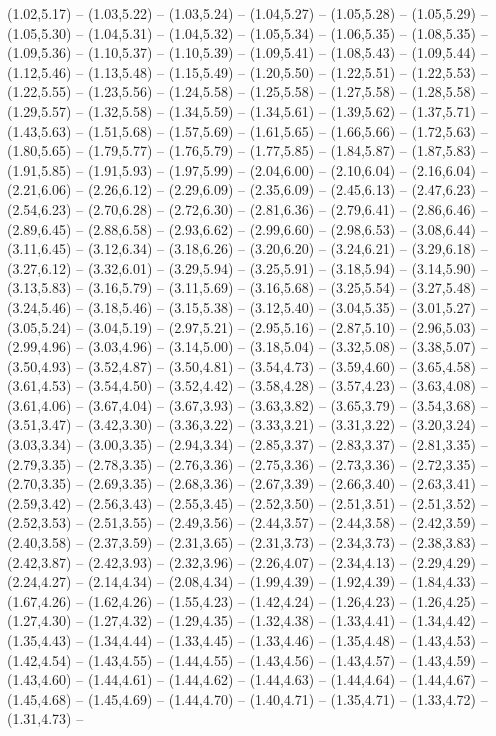 \expandafter\def\csname geo:gebiet:DE-RP\endcsname{
  (1.02,5.17) -- (1.03,5.22) -- (1.03,5.24) -- (1.04,5.27) -- (1.05,5.28) -- (1.05,5.29) -- (1.05,5.30) -- (1.04,5.31) -- (1.04,5.32) -- (1.05,5.34) -- (1.06,5.35) -- (1.08,5.35) -- (1.09,5.36) -- (1.10,5.37) -- (1.10,5.39) -- (1.09,5.41) -- (1.08,5.43) -- (1.09,5.44) -- (1.12,5.46) -- (1.13,5.48) -- (1.15,5.49) -- (1.20,5.50) -- (1.22,5.51) -- (1.22,5.53) -- (1.22,5.55) -- (1.23,5.56) -- (1.24,5.58) -- (1.25,5.58) -- (1.27,5.58) -- (1.28,5.58) -- (1.29,5.57) -- (1.32,5.58) -- (1.34,5.59) -- (1.34,5.61) -- (1.39,5.62) -- (1.37,5.71) -- (1.43,5.63) -- (1.51,5.68) -- (1.57,5.69) -- (1.61,5.65) -- (1.66,5.66) -- (1.72,5.63) -- (1.80,5.65) -- (1.79,5.77) -- (1.76,5.79) -- (1.77,5.85) -- (1.84,5.87) -- (1.87,5.83) -- (1.91,5.85) -- (1.91,5.93) -- (1.97,5.99) -- (2.04,6.00) -- (2.10,6.04) -- (2.16,6.04) -- (2.21,6.06) -- (2.26,6.12) -- (2.29,6.09) -- (2.35,6.09) -- (2.45,6.13) -- (2.47,6.23) -- (2.54,6.23) -- (2.70,6.28) -- (2.72,6.30) -- (2.81,6.36) -- (2.79,6.41) -- (2.86,6.46) -- (2.89,6.45) -- (2.88,6.58) -- (2.93,6.62) -- (2.99,6.60) -- (2.98,6.53) -- (3.08,6.44) -- (3.11,6.45) -- (3.12,6.34) -- (3.18,6.26) -- (3.20,6.20) -- (3.24,6.21) -- (3.29,6.18) -- (3.27,6.12) -- (3.32,6.01) -- (3.29,5.94) -- (3.25,5.91) -- (3.18,5.94) -- (3.14,5.90) -- (3.13,5.83) -- (3.16,5.79) -- (3.11,5.69) -- (3.16,5.68) -- (3.25,5.54) -- (3.27,5.48) -- (3.24,5.46) -- (3.18,5.46) -- (3.15,5.38) -- (3.12,5.40) -- (3.04,5.35) -- (3.01,5.27) -- (3.05,5.24) -- (3.04,5.19) -- (2.97,5.21) -- (2.95,5.16) -- (2.87,5.10) -- (2.96,5.03) -- (2.99,4.96) -- (3.03,4.96) -- (3.14,5.00) -- (3.18,5.04) -- (3.32,5.08) -- (3.38,5.07) -- (3.50,4.93) -- (3.52,4.87) -- (3.50,4.81) -- (3.54,4.73) -- (3.59,4.60) -- (3.65,4.58) -- (3.61,4.53) -- (3.54,4.50) -- (3.52,4.42) -- (3.58,4.28) -- (3.57,4.23) -- (3.63,4.08) -- (3.61,4.06) -- (3.67,4.04) -- (3.67,3.93) -- (3.63,3.82) -- (3.65,3.79) -- (3.54,3.68) -- (3.51,3.47) -- (3.42,3.30) -- (3.36,3.22) -- (3.33,3.21) -- (3.31,3.22) -- (3.20,3.24) -- (3.03,3.34) -- (3.00,3.35) -- (2.94,3.34) -- (2.85,3.37) -- (2.83,3.37) -- (2.81,3.35) -- (2.79,3.35) -- (2.78,3.35) -- (2.76,3.36) -- (2.75,3.36) -- (2.73,3.36) -- (2.72,3.35) -- (2.70,3.35) -- (2.69,3.35) -- (2.68,3.36) -- (2.67,3.39) -- (2.66,3.40) -- (2.63,3.41) -- (2.59,3.42) -- (2.56,3.43) -- (2.55,3.45) -- (2.52,3.50) -- (2.51,3.51) -- (2.51,3.52) -- (2.52,3.53) -- (2.51,3.55) -- (2.49,3.56) -- (2.44,3.57) -- (2.44,3.58) -- (2.42,3.59) -- (2.40,3.58) -- (2.37,3.59) -- (2.31,3.65) -- (2.31,3.73) -- (2.34,3.73) -- (2.38,3.83) -- (2.42,3.87) -- (2.42,3.93) -- (2.32,3.96) -- (2.26,4.07) -- (2.34,4.13) -- (2.29,4.29) -- (2.24,4.27) -- (2.14,4.34) -- (2.08,4.34) -- (1.99,4.39) -- (1.92,4.39) -- (1.84,4.33) -- (1.67,4.26) -- (1.62,4.26) -- (1.55,4.23) -- (1.42,4.24) -- (1.26,4.23) -- (1.26,4.25) -- (1.27,4.30) -- (1.27,4.32) -- (1.29,4.35) -- (1.32,4.38) -- (1.33,4.41) -- (1.34,4.42) -- (1.35,4.43) -- (1.34,4.44) -- (1.33,4.45) -- (1.33,4.46) -- (1.35,4.48) -- (1.43,4.53) -- (1.42,4.54) -- (1.43,4.55) -- (1.44,4.55) -- (1.43,4.56) -- (1.43,4.57) -- (1.43,4.59) -- (1.43,4.60) -- (1.44,4.61) -- (1.44,4.62) -- (1.44,4.63) -- (1.44,4.64) -- (1.44,4.67) -- (1.45,4.68) -- (1.45,4.69) -- (1.44,4.70) -- (1.40,4.71) -- (1.35,4.71) -- (1.33,4.72) -- (1.31,4.73) -- }
